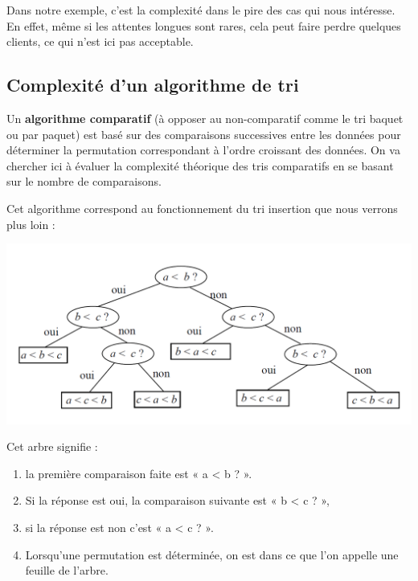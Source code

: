 \begin{exemple2}

Dans notre exemple, c'est la complexité dans le pire des cas qui nous intéresse. En effet, même si les attentes longues sont rares, cela peut faire perdre quelques clients, ce qui n'est ici pas acceptable.

\end{exemple2}


\subsection{Complexité d'un algorithme de tri}

\begin{definition2}

Un \textbf{algorithme comparatif} (à opposer au non-comparatif comme le tri baquet ou par paquet) est basé sur des comparaisons successives entre les données pour déterminer la permutation correspondant à l'ordre croissant des données.
On va chercher ici à évaluer la complexité théorique des tris comparatifs en se basant sur le nombre de comparaisons.
\end{definition2}



\begin{exemple2}

Cet algorithme correspond au fonctionnement du tri insertion que nous verrons plus loin :

\begin{center}
\includegraphics[width=.8\textwidth]{images/C2.png}
\end{center}


Cet arbre signifie : 
\begin{enumerate}
\item la première comparaison faite est « a < b ? ».
\item Si la réponse est oui, la comparaison suivante est « b < c ? »,
\item si la réponse est non c'est « a < c ? ». 
\item Lorsqu'une permutation est déterminée, on est dans ce que l'on appelle une feuille de l'arbre.
\end{enumerate}
\end{exemple2}
 
